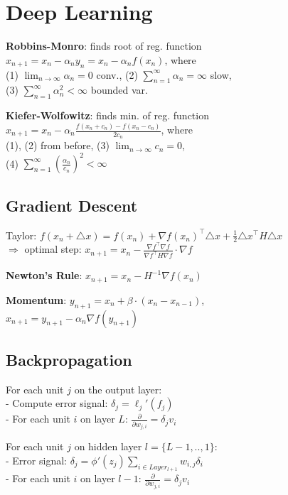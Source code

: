 \section{Deep Learning}

\textbf{Robbins-Monro}: finds root of reg. function \\
$x_{n+1} = x_n - \alpha_n y_n = x_n - \alpha_n f(x_n)$, where \\
(1) $\lim_{n\rightarrow \infty} \alpha_n = 0$ {\tiny conv.}, (2) $\sum_{n=1}^\infty \alpha_n = \infty$ {\tiny slow},\\
(3) $\sum_{n=1}^\infty \alpha_n^2 < \infty$ {\tiny bounded var.}

\textbf{Kiefer-Wolfowitz}: finds min. of reg. function \\
$x_{n+1} = x_n - \alpha_n \frac{f(x_n + c_n) - f(x_n - c_n)}{2 c_n}$, where \\
(1), (2) from before, (3) $\lim_{n\rightarrow \infty} c_n = 0$, \\
(4) $\sum_{n=1}^\infty (\frac{\alpha_n}{c_n})^2 < \infty$

\subsection*{Gradient Descent}
Taylor: {\footnotesize $f(x_n + \triangle x) = f(x_n) + \nabla f(x_n)^\top \triangle x + \frac{1}{2} \triangle x^\top H \triangle x$} \\
$\Rightarrow$ optimal step: $x_{n+1} = x_n - \frac{\nabla f^\top \nabla f}{\nabla f^\top H \nabla f} \cdot \nabla f$

\textbf{Newton's Rule}: $x_{n+1} = x_n - H^{-1} \nabla f(x_n)$

\textbf{Momentum}: $y_{n+1} = x_n + \beta \cdot (x_n - x_{n-1})$, \\$x_{n+1} = y_{n+1} - \alpha_n \nabla f(y_{n+1})$

\subsection*{Backpropagation}
For each unit $j$ on the output layer:\\
- Compute error signal: $\delta_j = \ell_j'(f_j)$\\
- For each unit $i$ on layer $L$: $\frac{\partial}{\partial w_{j,i}} = \delta_j v_i$

For each unit $j$ on hidden layer $l=\{L-1,..,1\}$:\\
- Error signal: $\delta_j = \phi'(z_j) \sum_{i\in Layer_{l+1}} w_{i,j}\delta_i$\\
- For each unit $i$ on layer $l-1$: $\frac{\partial}{\partial w_{j,i}} = \delta_j v_i$

